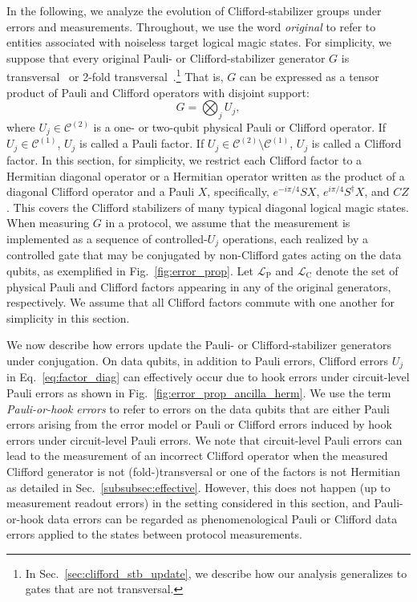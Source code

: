 \documentclass[
 reprint,
 amsmath,amssymb,
 pra,superscriptaddress, nofootinbib
]{revtex4-2}
\theoremstyle{definition}
\theoremstyle{plain}
\newcommand{\cC}{\mathcal C}
\begin{document}
In the following, we analyze the evolution of Clifford-stabilizer groups under errors and measurements. 
Throughout, we use the word \emph{original} to refer to entities associated with noiseless target logical magic states.
For simplicity, we suppose that every original Pauli- or Clifford-stabilizer generator $G$ is transversal~\cite{PhysRevLett.102.110502} or 2-fold transversal~\cite{Breuckmann2024foldtransversal,y14y-7kp3}.\footnote{In Sec.~\ref{sec:clifford_stb_update}, we describe how our analysis generalizes to gates that are not transversal.} 
That is, $G$ can be expressed as a tensor product of Pauli and Clifford operators with disjoint support:
\begin{equation}
  G = \bigotimes_j U_j,
    \label{eq:factor_diag}
\end{equation}
where $U_j \in \cC^{(2)}$ is a one- or two-qubit physical Pauli or Clifford operator.
If $U_j \in\cC^{(1)}$, $U_j$ is called a Pauli factor. If $U_j \in \cC^{(2)} \setminus \cC^{(1)}$, $U_j$ is called a Clifford factor.
In this section, for simplicity, we restrict each Clifford factor to a Hermitian diagonal operator or a Hermitian operator written as the product of a diagonal Clifford operator and a Pauli $X$, specifically, $e^{-i\pi/4}SX$, $e^{i\pi/4}S^\dagger X$, and $CZ$.
This covers the Clifford stabilizers of many typical diagonal logical magic states. 
When measuring $G$ in a protocol, we assume that the measurement is implemented as a sequence of controlled-$U_j$ operations, each realized by a controlled gate that may be conjugated by non-Clifford gates acting on the data qubits, as exemplified in Fig.~\ref{fig:error_prop}.
Let $\mathcal L_{\mathrm{P}}$ and $\mathcal L_{\mathrm{C}}$ denote the set of physical Pauli and Clifford factors appearing in any of the original  generators, respectively. 
We assume that all Clifford factors commute with one another for simplicity in this section.

We now describe how errors update the Pauli- or Clifford-stabilizer generators under conjugation. On data qubits, in addition to Pauli errors, Clifford errors $U_j$ in Eq.~\eqref{eq:factor_diag} can effectively occur due to hook errors under circuit-level Pauli errors as shown in Fig.~\ref{fig:error_prop_ancilla_herm}. 
We use the term \emph{Pauli-or-hook errors} to refer to errors on the data qubits that are either Pauli errors arising from the error model or Pauli or Clifford errors induced by hook errors under circuit-level Pauli errors. 
We note that circuit-level Pauli errors can lead to the measurement of an incorrect Clifford operator when the measured Clifford generator is not (fold-)transversal or one of the factors is not Hermitian as detailed in Sec.~\ref{subsubsec:effective}.
However, this does not happen (up to measurement readout errors) in the setting considered in this section, and Pauli-or-hook data errors can be regarded as phenomenological Pauli or Clifford data errors applied to the states between protocol measurements.
\end{document}
